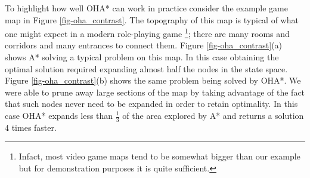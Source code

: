 To highlight how well OHA* can work in practice consider the example game map in Figure 
\ref{fig-oha_contrast}. 
The topography of this map is typical of what one might expect in a modern role-playing game
\footnote{Infact, most video game maps tend to be somewhat bigger than our example but for demonstration 
purposes it is quite sufficient.};
there are many rooms and corridors and many entrances to connect them.
Figure \ref{fig-oha_contrast}(a) shows A* solving a typical problem on this map. 
In this case obtaining the optimal solution required expanding almost half the nodes in the state space.
Figure \ref{fig-oha_contrast}(b) shows the same problem being solved by OHA*.
We were able to prune away large sections of the map by taking advantage of the fact that
such nodes never need to be expanded in order to retain optimality.
In this case OHA* expands less than $\frac{1}{3}$ of the area explored by A* and returns
a solution 4 times faster.

